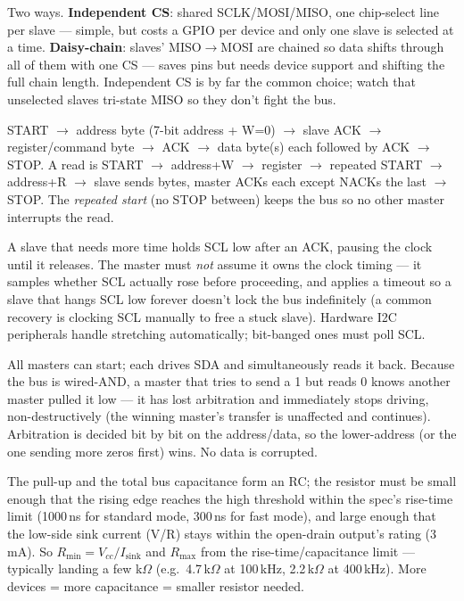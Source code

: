 Two ways. \textbf{Independent CS}: shared SCLK/MOSI/MISO, one chip-select line
per slave --- simple, but costs a GPIO per device and only one slave is selected
at a time. \textbf{Daisy-chain}: slaves' MISO$\rightarrow$MOSI are chained so
data shifts through all of them with one CS --- saves pins but needs device
support and shifting the full chain length. Independent CS is by far the common
choice; watch that unselected slaves tri-state MISO so they don't fight the bus.

START $\rightarrow$ address byte (7-bit address + W=0) $\rightarrow$ slave ACK
$\rightarrow$ register/command byte $\rightarrow$ ACK $\rightarrow$ data byte(s)
each followed by ACK $\rightarrow$ STOP. A read is START $\rightarrow$ address+W
$\rightarrow$ register $\rightarrow$ repeated START $\rightarrow$ address+R
$\rightarrow$ slave sends bytes, master ACKs each except NACKs the last
$\rightarrow$ STOP. The \emph{repeated start} (no STOP between) keeps the bus so
no other master interrupts the read.

A slave that needs more time holds SCL low after an ACK, pausing the clock until
it releases. The master must \emph{not} assume it owns the clock timing --- it
samples whether SCL actually rose before proceeding, and applies a timeout so a
slave that hangs SCL low forever doesn't lock the bus indefinitely (a common
recovery is clocking SCL manually to free a stuck slave). Hardware I2C
peripherals handle stretching automatically; bit-banged ones must poll SCL.

All masters can start; each drives SDA and simultaneously reads it back. Because
the bus is wired-AND, a master that tries to send a 1 but reads 0 knows another
master pulled it low --- it has lost arbitration and immediately stops driving,
non-destructively (the winning master's transfer is unaffected and continues).
Arbitration is decided bit by bit on the address/data, so the lower-address (or
the one sending more zeros first) wins. No data is corrupted.

The pull-up and the total bus capacitance form an RC; the resistor must be small
enough that the rising edge reaches the high threshold within the spec's
rise-time limit (1000\,ns for standard mode, 300\,ns for fast mode), and large
enough that the low-side sink current (V/R) stays within the open-drain output's
rating (3\,mA). So $R_{\min}=V_{cc}/I_{\text{sink}}$ and $R_{\max}$ from the
rise-time/capacitance limit --- typically landing a few k$\Omega$ (e.g.\
4.7\,k$\Omega$ at 100\,kHz, 2.2\,k$\Omega$ at 400\,kHz). More devices = more
capacitance = smaller resistor needed.

